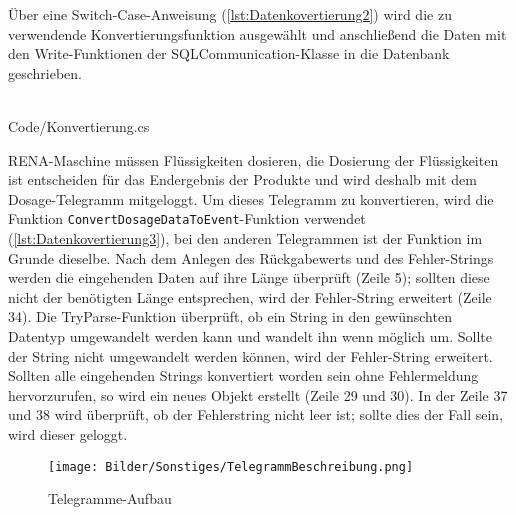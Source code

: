 Über eine Switch-Case-Anweisung (\autoref{lst:Datenkovertierung2}) wird die zu verwendende Konvertierungsfunktion ausgewählt und anschließend die Daten mit den \glqq Write\grqq{}-Funktionen der SQLCommunication-Klasse in die Datenbank geschrieben. 
\ \\
\begin{minipage}{\textwidth}
\ \\
 {Code/Konvertierung.cs}
\ \\
\end{minipage}
RENA-Maschine müssen Flüssigkeiten dosieren, die Dosierung der Flüssigkeiten ist entscheiden für das Endergebnis der Produkte und wird deshalb mit dem Dosage-Telegramm mitgeloggt. Um dieses Telegramm zu konvertieren, wird die Funktion \texttt{ConvertDosageData\-ToEvent}-Funktion verwendet (\autoref{lst:Datenkovertierung3}), bei den anderen Telegrammen ist der Funktion im Grunde dieselbe. Nach dem Anlegen des Rückgabewerts und des Fehler-Strings werden die eingehenden Daten auf ihre Länge überprüft (Zeile 5); sollten diese nicht der benötigten Länge entsprechen, wird der Fehler-String erweitert (Zeile 34). Die TryParse-Funktion überprüft, ob ein String in den gewünschten Datentyp umgewandelt werden kann und wandelt ihn wenn möglich um. Sollte der String nicht umgewandelt werden können, wird der Fehler-String erweitert. Sollten alle eingehenden Strings konvertiert worden sein ohne Fehlermeldung hervorzurufen, so wird ein neues Objekt erstellt (Zeile 29 und 30). In der Zeile 37 und 38 wird überprüft, ob der Fehlerstring nicht leer ist; sollte dies der Fall sein, wird dieser geloggt.
\begin{figure}
\centering
 \texttt{[image: Bilder/Sonstiges/TelegrammBeschreibung.png]}
 \caption[Telegramme-Aufbau]{Telegramme-Aufbau}
 \label{fig:Telegram}
\end{figure}
\ \\
